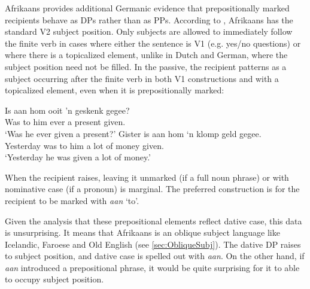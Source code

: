 Afrikaans provides additional Germanic evidence that prepositionally marked recipients behave as DPs rather than as PPs. According to \cite{Stadler.1996}, Afrikaans has the standard V2 subject position. Only subjects are allowed to immediately follow the finite verb in cases where either the sentence is V1 (e.g. yes/no questions) or where there is a topicalized element, unlike in Dutch and German, where the subject position need not be filled. In the passive, the recipient patterns as a subject occurring after the finite verb in both V1 constructions and with a topicalized element, even when it is prepositionally marked:
\begin{exe}
\ex
\begin{xlist}
\ex \gll Is aan hom ooit 'n geskenk gegee?\\
Was to him ever a present given.\\
\trans `Was he ever given a present?'
\ex \gll Gister is aan hom `n klomp geld gegee.\\
Yesterday was to him a {lot of} money given.\\
\trans `Yesterday he was given a lot of money.'
\end{xlist}
\end{exe}

When the recipient raises, leaving it unmarked (if a full noun phrase) or with nominative case (if a pronoun) is marginal. The preferred construction is for the recipient to be marked with \emph{aan} `to'.

\begin{exe}
\ex 
\begin{xlist}
\end{xlist}
\end{exe}

Given the analysis that these prepositional elements reflect dative case, this data is unsurprising. It means that Afrikaans is an oblique subject language like Icelandic, Faroese and Old English (see \autoref{sec:ObliqueSubj}). The dative DP raises to subject position, and dative case is spelled out with \emph{aan}. On the other hand, if \emph{aan} introduced a prepositional phrase, it would be quite surprising for it to able to occupy subject position.

